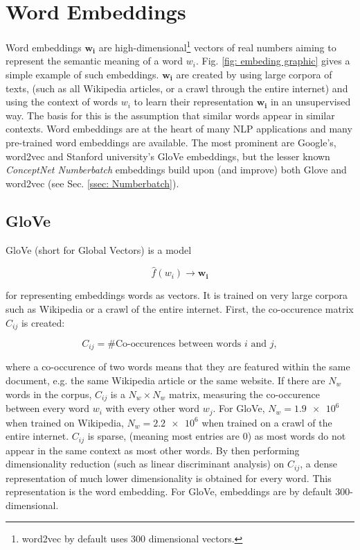 \section{Word Embeddings \label{ssec: word embeddings}}
    
    Word embeddings $\mathbf{w_i}$ are high-dimensional\footnote{word2vec by default uses 300 dimensional vectors.} vectors of real numbers aiming to represent the semantic meaning of a word $w_i$. Fig. \ref{fig: embeding graphic} gives a simple example of such embeddings. $\mathbf{w_i}$ are created by using large corpora of texts, (such as all Wikipedia articles, or a crawl through the entire internet) and using the context of words $w_i$ to learn their representation $\mathbf{w_i}$ in an unsupervised way. The basis for this is the assumption that similar words appear in similar contexts. Word embeddings are at the heart of many NLP applications and many pre-trained word embeddings are available. The most prominent are Google's, word2vec\cite{word2vec} and Stanford university's GloVe\cite{glove} embeddings, but the lesser known \textit{ConceptNet Numberbatch} embeddings\cite{conceptnet} build upon (and improve) both Glove and word2vec (see Sec. \ref{ssec: Numberbatch}).
    
    \subsection{GloVe \label{ssec: Glove}}
        GloVe\cite{glove} (short for Global Vectors) is a model 
        
        \[ \hat{f}(w_i) \rightarrow \mathbf{w_i}\] 
        
        for representing embeddings words as vectors. It is trained on very large corpora such as Wikipedia or a crawl of the entire internet. First, the co-occurence matrix $C_{ij}$ is created:
        
        \begin{equation}
        C_{ij} = \text{\# Co-occurences between words $i$ and $j$},
        \end{equation}
        
        where a co-occurence of two words means that they are featured within the same document, e.g. the same Wikipedia article or the same website. If there are $N_w$ words in the corpus, $C_{ij}$ is a $N_w \times N_w$ matrix, measuring the co-occurence between every word $w_i$ with every other word $w_j$. For GloVe, $N_w = \num{1.9e6}$ when trained on Wikipedia, $N_w = \num{2.2e6}$ when trained on a crawl of the entire internet. $C_{ij}$ is sparse, (meaning most entries are 0) as most words do not appear in the same context as most other words. By then performing dimensionality reduction (such as linear discriminant analysis) on $C_{ij}$, a dense representation of much lower dimensionality is obtained for every word. This representation is the word embedding. For GloVe, embeddings are by default 300-dimensional.\cite{glove}
        
